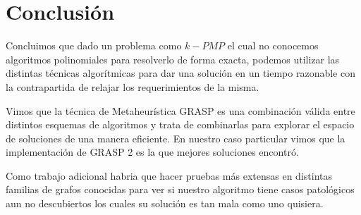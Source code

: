 \section{Conclusión}

Concluimos que dado un problema como $k-PMP$ el cual no conocemos algoritmos polinomiales para resolverlo de forma exacta, podemos utilizar las distintas técnicas algorítmicas para dar una solución en un tiempo razonable con la contrapartida de relajar los requerimientos de la misma. 

Vimos que la técnica de Metaheurística GRASP es una combinación válida entre distintos esquemas de algoritmos y trata de combinarlas para explorar el espacio de soluciones de una manera eficiente. En nuestro caso particular vimos que la implementación de GRASP 2 es la que mejores soluciones encontró. 

Como trabajo adicional habria que hacer pruebas más extensas en distintas familias de grafos conocidas para ver si nuestro algoritmo tiene casos patológicos aun no descubiertos los cuales su solución es tan mala como uno quisiera.